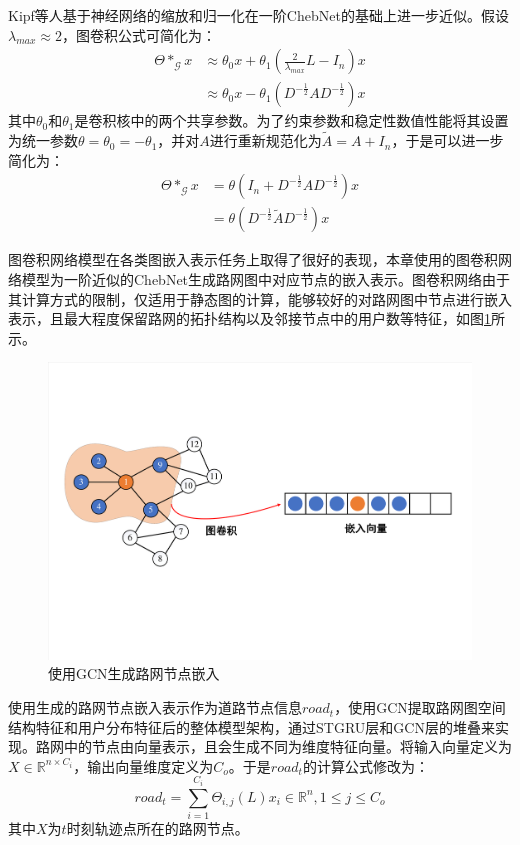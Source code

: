 \documentclass[master]{thesis-uestc}
\begin{document}
Kipf等人基于神经网络的缩放和归一化在一阶ChebNet的基础上进一步近似。假设$\lambda_{max}\approx 2$，图卷积公式可简化为：
\begin{align}
\Theta \ast_{\mathcal{G}} x & \approx \theta_0 x + \theta_1 (\frac{2}{\lambda_{max}}L-I_n)x\\
&\approx \theta_0 x - \theta_1(D^{-\frac{1}{2}}AD^{-\frac{1}{2}})x
\end{align}
其中$\theta_0$和$\theta_1$是卷积核中的两个共享参数。为了约束参数和稳定性数值性能将其设置为统一参数$\theta=\theta_0=-\theta_1$，并对$A$进行重新规范化为$\tilde{A}=A+I_n$，于是可以进一步简化为：
\begin{align}
\Theta \ast_{\mathcal{G}} x &= \theta(I_n+D^{-\frac{1}{2}}AD^{-\frac{1}{2}})x\\
&= \theta(D^{-\frac{1}{2}}\tilde{A}D^{-\frac{1}{2}})x
\end{align}

图卷积网络模型在各类图嵌入表示任务上取得了很好的表现，本章使用的图卷积网络模型为一阶近似的ChebNet生成路网图中对应节点的嵌入表示。图卷积网络由于其计算方式的限制，仅适用于静态图的计算，能够较好的对路网图中节点进行嵌入表示，且最大程度保留路网的拓扑结构以及邻接节点中的用户数等特征，如图\ref{Figure.4.2.3}所示。
\begin{figure}[!ht]
\centering
\includegraphics[scale=0.2]{./pic/gcn.pdf}
\caption{使用GCN生成路网节点嵌入}
\label{Figure.4.2.3}
\end{figure}

使用生成的路网节点嵌入表示作为道路节点信息$road_t$，使用GCN提取路网图空间结构特征和用户分布特征后的整体模型架构，通过STGRU层和GCN层的堆叠来实现。路网中的节点由向量表示，且会生成不同为维度特征向量。将输入向量定义为$X\in \mathbb{R}^{n \times C_i}$，输出向量维度定义为$C_o$。于是$road_t$的计算公式修改为：
\begin{equation}
   road_t = \sum\limits_{i=1}^{C_i} \Theta_{i,j}(L)x_i \in \mathbb{R}^n, 1 \leqslant j \leqslant C_o
\end{equation}
其中$X$为$t$时刻轨迹点所在的路网节点。
\end{document}
